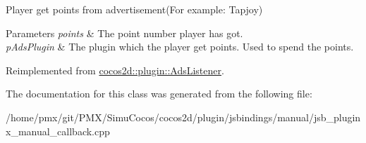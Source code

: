 Player get points from advertisement(\+For example\+: Tapjoy) 


\begin{DoxyParams}{Parameters}
{\em points} & The point number player has got. \\
\hline
{\em p\+Ads\+Plugin} & The plugin which the player get points. Used to spend the points. \\
\hline
\end{DoxyParams}


Reimplemented from \hyperlink{classcocos2d_1_1plugin_1_1AdsListener_a820961228a161de9f06cccabfd117d7c}{cocos2d\+::plugin\+::\+Ads\+Listener}.



The documentation for this class was generated from the following file\+:\begin{DoxyCompactItemize}
\item 
/home/pmx/git/\+P\+M\+X/\+Simu\+Cocos/cocos2d/plugin/jsbindings/manual/jsb\+\_\+pluginx\+\_\+manual\+\_\+callback.\+cpp\end{DoxyCompactItemize}
